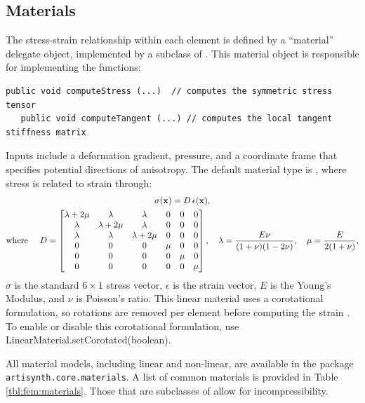 \subsection{Materials}
\label{sec:fem:materials}

The stress-strain relationship within each element is defined by a ``material''
delegate object, implemented by a subclass of 
.  This material object is 
responsible for implementing the functions:
%
\begin{lstlisting}[]
   public void computeStress (...)  // computes the symmetric stress tensor
   public void computeTangent (...) // computes the local tangent stiffness matrix
\end{lstlisting}
%
Inputs include a deformation gradient, pressure, and a coordinate frame that
specifies potential directions of anisotropy. The default material type is 
, where stress is related 
to strain through:
\begin{gather}
  \sigma({\bf x}) = D\,\epsilon({\bf x}), \label{eqn:fem:mat:linear}\\
  \text{where }\quad D = \begin{bmatrix}
	  \lambda +2\mu & \lambda & \lambda  & 0 & 0 & 0\\
	  \lambda &  \lambda +2\mu & \lambda & 0 & 0 & 0\\
	  \lambda & \lambda & \lambda +2\mu & 0 & 0 & 0\\
	  0 & 0 & 0 & \mu & 0 & 0\\
	  0 & 0 & 0 & 0 & \mu & 0\\
	  0 & 0 & 0 & 0 & 0 & \mu
        \end{bmatrix}, \quad \lambda = \dfrac{E\nu}{(1+\nu)(1-2\nu)},  \quad
      \mu = \dfrac{E}{2(1+\nu)},\notag
\end{gather}
$\sigma$ is the standard $6\times 1$ stress vector, $\epsilon$ is the 
strain vector, $E$ is the Young's Modulus, and $\nu$ is Poisson's ratio. This
linear material uses a corotational formulation, so rotations are removed
per element before computing the strain \cite{ngan:fem:2008}.  To enable or
disable this corotational formulation, use 
%
{LinearMaterial.setCorotated(boolean)}.

All material models, including linear and non-linear, are available in the package  
{\tt artisynth.core.materials}.  A list of common materials is provided in 
Table \ref{tbl:fem:materials}.  Those that are subclasses of 
 allow for 
incompressibility.

